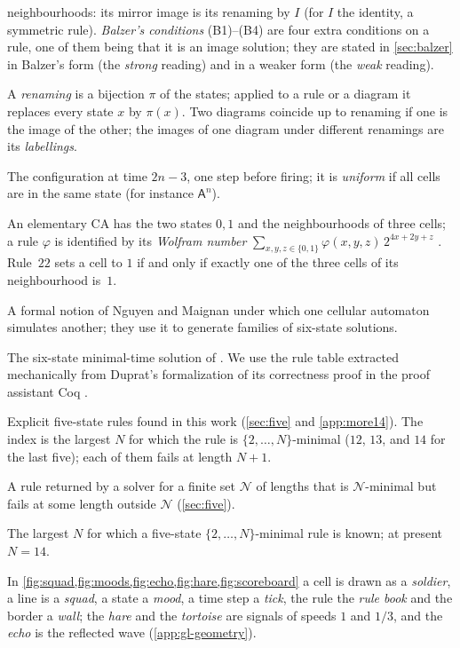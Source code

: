 {\begin{description}[style=unboxed,leftmargin=1em,font=\normalfont\bfseries,itemsep=1pt,parsep=0pt,topsep=2pt]
  neighbourhoods: its mirror image is its renaming by $I$ (for $I$ the
  identity, a symmetric rule). \emph{Balzer's conditions} (B1)--(B4) are
  four extra conditions on a rule, one of them being that it is an image
  solution; they are stated in \cref{sec:balzer} in Balzer's form (the
  \emph{strong} reading) and in a weaker form (the \emph{weak} reading).
\item[Renaming; labelling.] A \emph{renaming} is a bijection $\pi$ of the
  states; applied to a rule or a diagram it replaces every state $x$ by
  $\pi(x)$. Two diagrams coincide up to renaming if one is the image of the
  other; the images of one diagram under different renamings are its
  \emph{labellings}.
\item[Pre-firing configuration.] The configuration at time $2n-3$, one
  step before firing; it is \emph{uniform} if all cells are in the same
  state (for instance $\mathsf A^n$).
\item[Elementary cellular automaton; rule~$22$.] An elementary CA has
  the two states $0,1$ and the neighbourhoods of three cells; a rule
  $\varphi$ is identified by its \emph{Wolfram number}
  $\sum_{x,y,z\in\{0,1\}}\varphi(x,y,z)\,2^{4x+2y+z}$ \cite{Wolfram83}.
  Rule~$22$ sets a cell to $1$ if and only if exactly one of the three
  cells of its neighbourhood is~$1$.
\item[Local CA simulation.] A formal notion of Nguyen and Maignan
  \cite{NguyenMaignan20} under which one cellular automaton simulates
  another; they use it to generate families of six-state solutions.
\item[Mazoyer's solution.] The six-state minimal-time solution of
  \cite{Mazoyer87}. We use the rule table extracted mechanically from
  Duprat's formalization of its correctness proof in the proof assistant
  Coq \cite{Duprat97}.
\item[The rules $\delta_{12}$, $\delta_{13}$, $\delta_{14}$,
  $\delta_{14}^{\mathrm b},\dots,\delta_{14}^{\mathrm e}$.] Explicit
  five-state rules found in this work (\cref{sec:five} and
  \cref{app:more14}). The index is the largest $N$ for which the rule is
  $\{2,\dots,N\}$-minimal ($12$, $13$, and $14$ for the last five); each of
  them fails at length $N+1$.
\item[Lucky rule.] A rule returned by a solver for a finite set
  $\mathcal N$ of lengths that is $\mathcal N$-minimal but fails at some
  length outside $\mathcal N$ (\cref{sec:five}).
\item[Frontier.] The largest $N$ for which a five-state
  $\{2,\dots,N\}$-minimal rule is known; at present $N=14$.
\item[Picture vocabulary.] In \cref{fig:squad,fig:moods,fig:echo,fig:hare,fig:scoreboard}
  a cell is drawn as a \emph{soldier}, a line is a \emph{squad}, a state a
  \emph{mood}, a time step a \emph{tick}, the rule the \emph{rule book}
  and the border a \emph{wall}; the \emph{hare} and the \emph{tortoise} are
  signals of speeds $1$ and $1/3$, and the \emph{echo} is the reflected wave
  (\cref{app:gl-geometry}).
\end{description}

}
